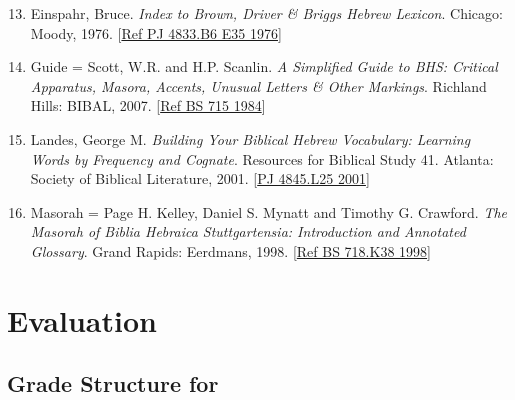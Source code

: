 \documentclass[titlepage]{article}
\begin{document}
\begin{enumerate}\setcounter{enumi}{12}

	\item Einspahr, Bruce. \emph{Index to Brown, Driver \& Briggs Hebrew
	Lexicon}. Chicago: Moody, 1976.
	[\href{http://tyndale.worldcat.org/oclc/3741038}{Ref PJ 4833.B6 E35 1976}]

	\item Guide = Scott, W.R. and H.P. Scanlin. \emph{A Simplified Guide
	to BHS: Critical Apparatus, Masora, Accents, Unusual Letters \&
	Other Markings}. Richland Hills: BIBAL, 2007.
	[\href{http://tyndale.worldcat.org/oclc/17336542}{Ref BS 715 1984}]

	\item Landes, George M. \emph{Building Your Biblical Hebrew
	Vocabulary: Learning Words by Frequency and Cognate}. Resources for
	Biblical Study 41. Atlanta: Society of Biblical Literature, 2001.
	[\href{http://tyndale.worldcat.org/oclc/45230417}{PJ 4845.L25 2001}]

	\item Masorah = Page H. Kelley, Daniel S. Mynatt and Timothy G.
	Crawford. \emph{The Masorah of Biblia Hebraica Stuttgartensia:
	Introduction and Annotated Glossary}. Grand Rapids: Eerdmans, 1998.
	[\href{http://tyndale.worldcat.org/oclc/38168226}{Ref BS 718.K38 1998}]

\end{enumerate}

\section{Evaluation}
\label{evaluation}

\subsection{Grade Structure for \ccode}
\label{structure}

\end{document}
